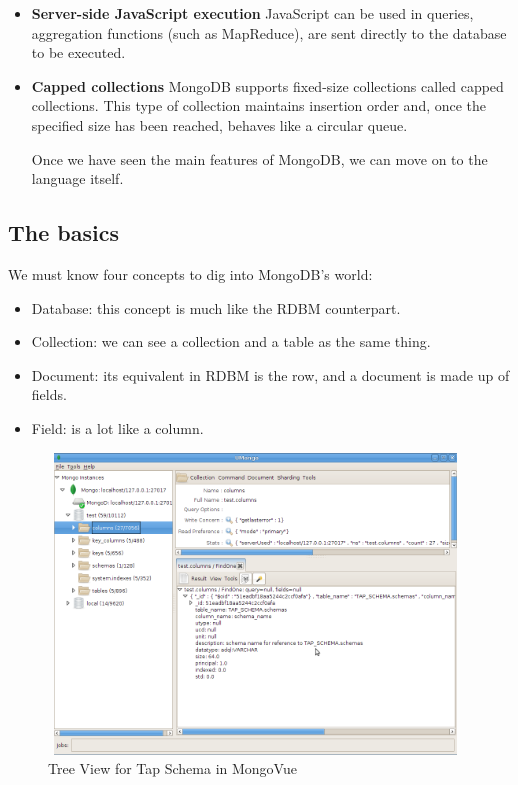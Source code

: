 \begin{itemize}
\item \textbf{Server-side JavaScript execution} 
JavaScript can be used in queries, aggregation functions (such as MapReduce), are sent directly to the database to be executed.

\item \textbf{Capped collections} 
MongoDB supports fixed-size collections called capped collections. This type of collection maintains insertion order and, once the specified size has been reached, behaves like a circular queue.

Once we have seen the main features of MongoDB, we can move on to the language itself.
\end{itemize}


\subsection{The basics}

We must know four concepts to dig into MongoDB's world:

\begin{itemize}
\item Database: this concept is much like the RDBM counterpart.
\item Collection: we can see a collection and a table as the same thing.
\item Document: its equivalent in RDBM is the row, and a document is made up of fields.
\item Field: is a lot like a column.
\end{itemize}


\begin{figure}[H]
\centering
\includegraphics[width=11cm,height=8cm]{images/mongo_dia.png}
\caption{Tree View for Tap Schema in MongoVue}
\end{figure}


